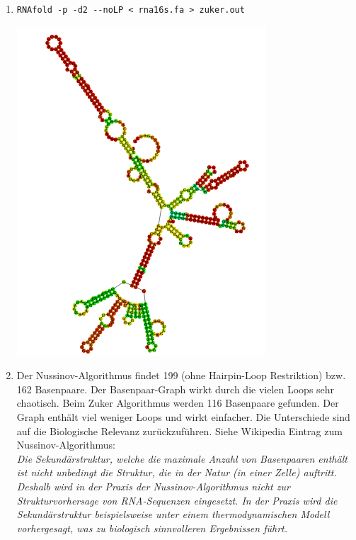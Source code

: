 \documentclass{homework}
\begin{document}
\begin{enumerate}
\begin{enumerate}
\item
\begin{verbatim}
RNAfold -p -d2 --noLP < rna16s.fa > zuker.out
\end{verbatim}

\includegraphics[scale=0.5]{../data/u8_aufg27_zuker_output}

\item
Der Nussinov-Algorithmus findet 199 (ohne Hairpin-Loop Restriktion) bzw. 162 Basenpaare. Der Basenpaar-Graph wirkt durch die vielen Loops sehr chaotisch. Beim Zuker Algorithmus werden 116 Basenpaare gefunden. 
Der Graph enthält viel weniger Loops und wirkt einfacher. 
Die Unterschiede sind auf die Biologische Relevanz zurückzuführen. Siehe Wikipedia Eintrag zum Nussinov-Algorithmus:\\
\textit{Die Sekundärstruktur, welche die maximale Anzahl von Basenpaaren enthält ist nicht unbedingt die Struktur, die in der Natur (in einer Zelle) auftritt. Deshalb wird in der Praxis der Nussinov-Algorithmus nicht zur Strukturvorhersage von RNA-Sequenzen eingesetzt. In der Praxis wird die Sekundärstruktur beispielsweise unter einem thermodynamischen Modell vorhergesagt, was zu biologisch sinnvolleren Ergebnissen führt.}

\end{enumerate}



\end{enumerate}
\end{document}
